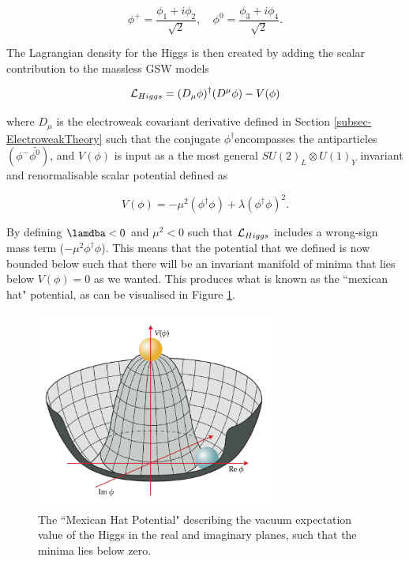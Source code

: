 \begin{equation}
\phi^+ = \frac{\phi_1 + i \phi_2}{\sqrt{2}}, \quad \phi^0 = \frac{\phi_3 + i\phi_4}{\sqrt{2}}.
\end{equation}

The Lagrangian density for the Higgs is then created by adding the scalar contribution to the massless GSW models

\begin{equation}
\mathcal{L}_{Higgs} = (D_{\mu}\phi)^{\dagger}(D^{\mu}\phi) - V(\phi)
\end{equation}

where $D_{\mu}$ is the electroweak covariant derivative defined in Section \ref{subsec-ElectroweakTheory} such that the conjugate $\phi^{\dagger}$encompasses the antiparticles $(\phi^-\bar{\phi^0})$, and $V(\phi)$ is input as a the most general $SU(2)_L \otimes U(1)_Y$ invariant and renormalisable scalar potential defined as

\begin{equation}
V(\phi) = -\mu^2(\phi^{\dagger}\phi) + \lambda(\phi^{\dagger}\phi)^2.
\end{equation}

By defining $\lamdba < 0$ and $\mu^2 < 0$ such that $\mathcal{L}_{Higgs}$ includes a wrong-sign mass term ($-\mu^2\phi^{\dagger}\phi$). This means that the potential that we defined is now bounded below such that there will be an invariant manifold of minima that lies below $V(\phi)=0$ as we wanted. This produces what is known as the ``mexican hat" potential, as can be visualised in Figure \ref{fig-MHP}.

\begin{figure} \label{fig-MHP}
\begin{center}
\includegraphics[width=0.7\textwidth]{Figures/MexicanHatPotential.png}
\caption{The ``Mexican Hat Potential" describing the vacuum expectation value of the Higgs in the real and imaginary planes, such that the minima lies below zero.}
\end{center}
\end{figure}

